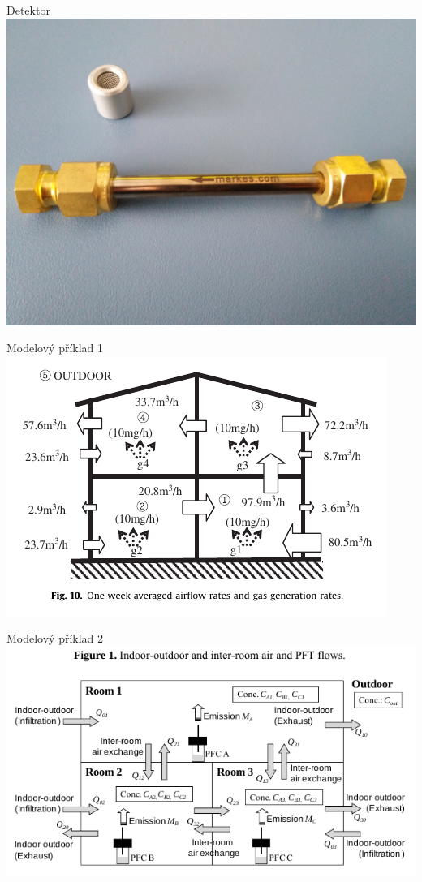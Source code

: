 \documentclass[10pt]{beamer}
\begin{document}
\begin{frame}{Detektor}
    \small
    \centering
        \includegraphics[width=.6\textwidth]{meridlo_traceru.jpg}
\end{frame}

\begin{frame}{Modelový příklad 1}
        \centering
        \includegraphics[width=.9\textwidth]{zony.png}
        \cite{japonci}       
\end{frame}

\begin{frame}{Modelový příklad 2}
        \centering
        \includegraphics[width=.9\textwidth]{zony2.png}
        \cite{japonci2}       
\end{frame}
\end{document}

